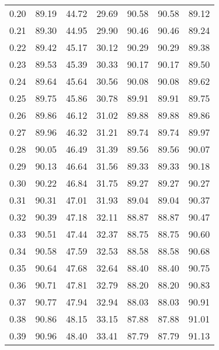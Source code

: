 \begin{tabular}{|c|c|c|c|c|c|c|}
      0.20 &     89.19 &     44.72 &      29.69 &   90.58 &      90.58 &         89.12 \\
      0.21 &     89.30 &     44.95 &      29.90 &   90.46 &      90.46 &         89.24 \\
      0.22 &     89.42 &     45.17 &      30.12 &   90.29 &      90.29 &         89.38 \\
      0.23 &     89.53 &     45.39 &      30.33 &   90.17 &      90.17 &         89.50 \\
      0.24 &     89.64 &     45.64 &      30.56 &   90.08 &      90.08 &         89.62 \\
      0.25 &     89.75 &     45.86 &      30.78 &   89.91 &      89.91 &         89.75 \\
      0.26 &     89.86 &     46.12 &      31.02 &   89.88 &      89.88 &         89.86 \\
      0.27 &     89.96 &     46.32 &      31.21 &   89.74 &      89.74 &         89.97 \\
      0.28 &     90.05 &     46.49 &      31.39 &   89.56 &      89.56 &         90.07 \\
      0.29 &     90.13 &     46.64 &      31.56 &   89.33 &      89.33 &         90.18 \\
      0.30 &     90.22 &     46.84 &      31.75 &   89.27 &      89.27 &         90.27 \\
      0.31 &     90.31 &     47.01 &      31.93 &   89.04 &      89.04 &         90.37 \\
      0.32 &     90.39 &     47.18 &      32.11 &   88.87 &      88.87 &         90.47 \\
      0.33 &     90.51 &     47.44 &      32.37 &   88.75 &      88.75 &         90.60 \\
      0.34 &     90.58 &     47.59 &      32.53 &   88.58 &      88.58 &         90.68 \\
      0.35 &     90.64 &     47.68 &      32.64 &   88.40 &      88.40 &         90.75 \\
      0.36 &     90.71 &     47.81 &      32.79 &   88.20 &      88.20 &         90.83 \\
      0.37 &     90.77 &     47.94 &      32.94 &   88.03 &      88.03 &         90.91 \\
      0.38 &     90.86 &     48.15 &      33.15 &   87.88 &      87.88 &         91.01 \\
      0.39 &     90.96 &     48.40 &      33.41 &   87.79 &      87.79 &         91.13 \\

\end{tabular}
